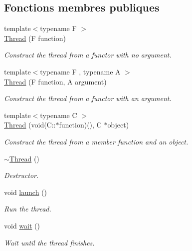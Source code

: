 \subsection*{Fonctions membres publiques}
\begin{DoxyCompactItemize}
\item 
{\footnotesize template$<$typename F $>$ }\\\hyperlink{classsf_1_1Thread_a4cc65399bbb111cf8132537783b8e96c}{Thread} (F function)
\begin{DoxyCompactList}\small\item\em Construct the thread from a functor with no argument. \end{DoxyCompactList}\item 
{\footnotesize template$<$typename F , typename A $>$ }\\\hyperlink{classsf_1_1Thread_a719b2cc067d92d52c35064a49d850a53}{Thread} (F function, A argument)
\begin{DoxyCompactList}\small\item\em Construct the thread from a functor with an argument. \end{DoxyCompactList}\item 
{\footnotesize template$<$typename C $>$ }\\\hyperlink{classsf_1_1Thread_aa9f473c8cbb078900c62b1fd14a83a34}{Thread} (void(C\+::$\ast$function)(), C $\ast$object)
\begin{DoxyCompactList}\small\item\em Construct the thread from a member function and an object. \end{DoxyCompactList}\item 
\hyperlink{classsf_1_1Thread_af77942fc1730af7c31bc4c3a913a9c1d}{$\sim$\+Thread} ()
\begin{DoxyCompactList}\small\item\em Destructor. \end{DoxyCompactList}\item 
void \hyperlink{classsf_1_1Thread_a74f75a9e86e1eb47479496314048b5f6}{launch} ()
\begin{DoxyCompactList}\small\item\em Run the thread. \end{DoxyCompactList}\item 
void \hyperlink{classsf_1_1Thread_a724b1f94c2d54f84280f2f78bde95fa0}{wait} ()
\begin{DoxyCompactList}\small\item\em Wait until the thread finishes. \end{DoxyCompactList}\item 

\end{DoxyCompactItemize}
